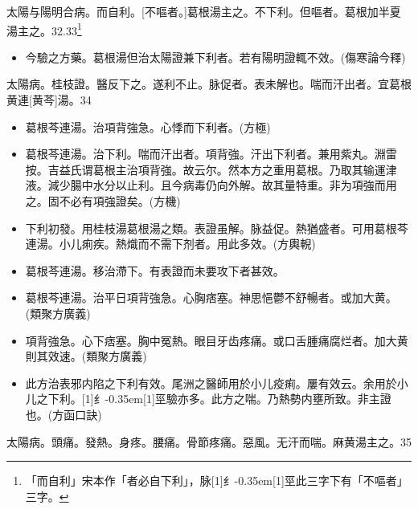 \documentclass[oneside,b4paper]{ctexbook}
\begin{document}
\begin{flushleft}
太陽与陽明合病。而自利。[不嘔者。]葛根湯主之。不下利。但嘔者。葛根加半夏湯主之。32.33\footnote{「而自利」宋本作「者必自下利」，脉{\hbox{\scalebox{0.68}[1]{纟}\kern-0.35em\scalebox{0.64}[1]{巠}}}此三字下有「不嘔者」三字。}

\begin{itemize}
\item 今驗之方藥。葛根湯但治太陽證兼下利者。若有陽明證輒不效。(傷寒論今釋)
\end{itemize}

太陽病。桂枝證。醫反下之。遂利不止。脉促者。表未解也。喘而汗出者。宜葛根黄連[黄芩]湯。34

\begin{itemize}
\item 葛根芩連湯。治項背強急。心悸而下利者。(方極)
\item 葛根芩連湯。治下利。喘而汗出者。項背強。汗出下利者。兼用紫丸。淵雷按。吉益氏谓葛根主治項背強。故云尔。然本方之重用葛根。乃取其输運津液。減少腸中水分以止利。且今病毒仍向外解。故其量特重。非为項強而用之。固不必有項強證矣。(方機)
\item 下利初發。用桂枝湯葛根湯之類。表證虽解。脉益促。熱猶盛者。可用葛根芩連湯。小儿痢疾。熱熾而不需下剂者。用此多效。(方輿輗)
\item 葛根芩連湯。移治滯下。有表證而未要攻下者甚效。
\item 葛根芩連湯。治平日項背強急。心胸痞塞。神思悒鬱不舒暢者。或加大黄。(類聚方廣義)
\item 項背強急。心下痞塞。胸中冤熱。眼目牙齿疼痛。或口舌腫痛腐烂者。加大黄則其效速。(類聚方廣義)
\item 此方治表邪内陷之下利有效。尾洲之醫師用於小儿疫痢。屢有效云。余用於小儿之下利。{\hbox{\scalebox{0.68}[1]{纟}\kern-0.35em\scalebox{0.64}[1]{巠}}}驗亦多。此方之喘。乃熱勢内壅所致。非主證也。(方函口訣)
\end{itemize}

太陽病。頭痛。發熱。身疼。腰痛。骨節疼痛。惡風。无汗而喘。麻黄湯主之。35


\end{flushleft}
\end{document}
